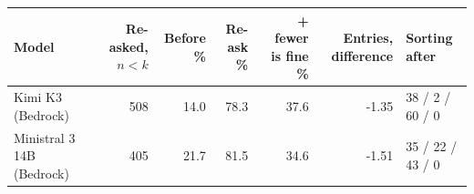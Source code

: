 \begin{tabular}{lrrrrrl}
  \toprule
  Model & Re-asked, $n < k$ & Before \% & Re-ask \% & + fewer is fine \% & Entries, difference & Sorting after \\
  \midrule
  Kimi K3 (Bedrock) & 508 & 14.0 & 78.3 & 37.6 & -1.35 & 38 / 2 / 60 / 0 \\
  Ministral 3 14B (Bedrock) & 405 & 21.7 & 81.5 & 34.6 & -1.51 & 35 / 22 / 43 / 0 \\
  \bottomrule
\end{tabular}
